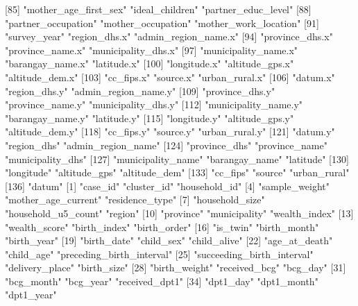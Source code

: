  [85] "mother_age_first_sex"      "ideal_children"            "partner_educ_level"       
 [88] "partner_occupation"        "mother_occupation"         "mother_work_location"     
 [91] "survey_year"               "region_dhs.x"              "admin_region_name.x"      
 [94] "province_dhs.x"            "province_name.x"           "municipality_dhs.x"       
 [97] "municipality_name.x"       "barangay_name.x"           "latitude.x"               
[100] "longitude.x"               "altitude_gps.x"            "altitude_dem.x"           
[103] "cc_fips.x"                 "source.x"                  "urban_rural.x"            
[106] "datum.x"                   "region_dhs.y"              "admin_region_name.y"      
[109] "province_dhs.y"            "province_name.y"           "municipality_dhs.y"       
[112] "municipality_name.y"       "barangay_name.y"           "latitude.y"               
[115] "longitude.y"               "altitude_gps.y"            "altitude_dem.y"           
[118] "cc_fips.y"                 "source.y"                  "urban_rural.y"            
[121] "datum.y"                   "region_dhs"                "admin_region_name"        
[124] "province_dhs"              "province_name"             "municipality_dhs"         
[127] "municipality_name"         "barangay_name"             "latitude"                 
[130] "longitude"                 "altitude_gps"              "altitude_dem"             
[133] "cc_fips"                   "source"                    "urban_rural"              
[136] "datum"                    
  [1] "case_id"                   "cluster_id"                "household_id"             
  [4] "sample_weight"             "mother_age_current"        "residence_type"           
  [7] "household_size"            "household_u5_count"        "region"                   
 [10] "province"                  "municipality"              "wealth_index"             
 [13] "wealth_score"              "birth_index"               "birth_order"              
 [16] "is_twin"                   "birth_month"               "birth_year"               
 [19] "birth_date"                "child_sex"                 "child_alive"              
 [22] "age_at_death"              "child_age"                 "preceding_birth_interval" 
 [25] "succeeding_birth_interval" "delivery_place"            "birth_size"               
 [28] "birth_weight"              "received_bcg"              "bcg_day"                  
 [31] "bcg_month"                 "bcg_year"                  "received_dpt1"            
 [34] "dpt1_day"                  "dpt1_month"                "dpt1_year"                
